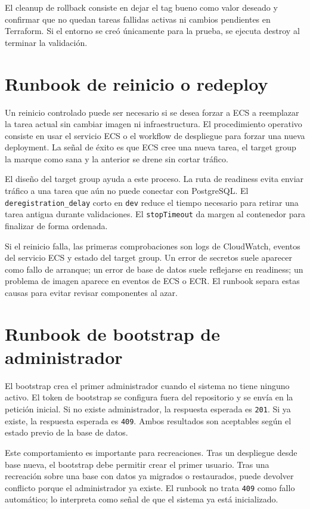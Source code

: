 El cleanup de rollback consiste en dejar el tag bueno como valor deseado y confirmar que no quedan tareas fallidas activas ni cambios pendientes en Terraform. Si el entorno se creó únicamente para la prueba, se ejecuta destroy al terminar la validación.

\section{Runbook de reinicio o redeploy}
\label{sec:runbook-redeploy}

Un reinicio controlado puede ser necesario si se desea forzar a ECS a reemplazar la tarea actual sin cambiar imagen ni infraestructura. El procedimiento operativo consiste en usar el servicio ECS o el workflow de despliegue para forzar una nueva deployment. La señal de éxito es que ECS cree una nueva tarea, el target group la marque como sana y la anterior se drene sin cortar tráfico.

El diseño del target group ayuda a este proceso. La ruta de readiness evita enviar tráfico a una tarea que aún no puede conectar con PostgreSQL. El \texttt{deregistration\_delay} corto en \texttt{dev} reduce el tiempo necesario para retirar una tarea antigua durante validaciones. El \texttt{stopTimeout} da margen al contenedor para finalizar de forma ordenada.

Si el reinicio falla, las primeras comprobaciones son logs de CloudWatch, eventos del servicio ECS y estado del target group. Un error de secretos suele aparecer como fallo de arranque; un error de base de datos suele reflejarse en readiness; un problema de imagen aparece en eventos de ECS o ECR. El runbook separa estas causas para evitar revisar componentes al azar.

\section{Runbook de bootstrap de administrador}
\label{sec:runbook-bootstrap}

El bootstrap crea el primer administrador cuando el sistema no tiene ninguno activo. El token de bootstrap se configura fuera del repositorio y se envía en la petición inicial. Si no existe administrador, la respuesta esperada es \texttt{201}. Si ya existe, la respuesta esperada es \texttt{409}. Ambos resultados son aceptables según el estado previo de la base de datos.

Este comportamiento es importante para recreaciones. Tras un despliegue desde base nueva, el bootstrap debe permitir crear el primer usuario. Tras una recreación sobre una base con datos ya migrados o restaurados, puede devolver conflicto porque el administrador ya existe. El runbook no trata \texttt{409} como fallo automático; lo interpreta como señal de que el sistema ya está inicializado.

